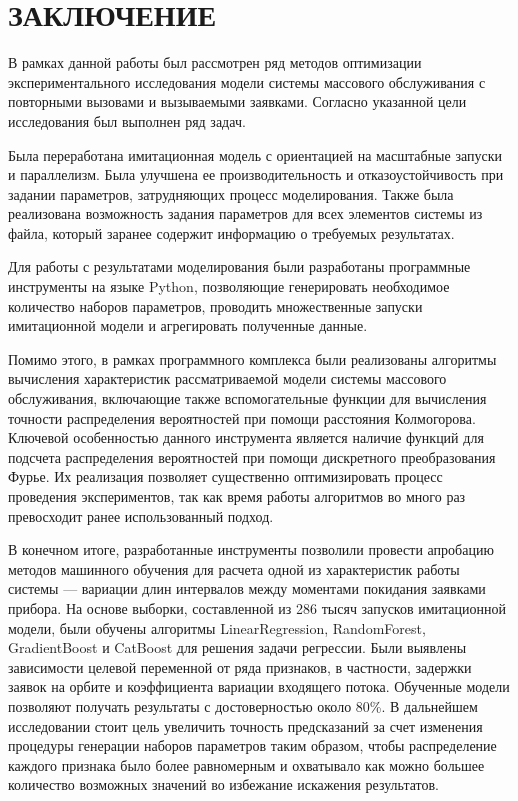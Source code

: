 \section*{\centering\normalsize ЗАКЛЮЧЕНИЕ}
В рамках данной работы был рассмотрен ряд методов оптимизации экспериментального исследования модели системы массового обслуживания с повторными вызовами и вызываемыми заявками. Согласно указанной цели исследования был выполнен ряд задач.

Была переработана имитационная модель с ориентацией на масштабные запуски и параллелизм. Была улучшена ее производительность и отказоустойчивость при задании параметров, затрудняющих процесс моделирования. Также была реализована возможность задания параметров для всех элементов системы из файла, который заранее содержит информацию о требуемых результатах.

Для работы с результатами моделирования были разработаны программные инструменты на языке Python, позволяющие генерировать необходимое количество наборов параметров, проводить множественные запуски имитационной модели и агрегировать полученные данные.

Помимо этого, в рамках программного комплекса были реализованы алгоритмы вычисления характеристик рассматриваемой модели системы массового обслуживания, включающие также вспомогательные функции для вычисления точности распределения вероятностей при помощи расстояния Колмогорова. Ключевой особенностью данного инструмента является наличие функций для подсчета распределения вероятностей при помощи дискретного преобразования Фурье. Их реализация позволяет существенно оптимизировать процесс проведения экспериментов, так как время работы алгоритмов во много раз превосходит ранее использованный подход.

В конечном итоге, разработанные инструменты позволили провести апробацию методов машинного обучения для расчета одной из характеристик работы системы --- вариации длин интервалов между моментами покидания заявками прибора. На основе выборки, составленной из 286 тысяч запусков имитационной модели, были обучены алгоритмы LinearRegression, RandomForest, GradientBoost и CatBoost для решения задачи регрессии. Были выявлены зависимости целевой переменной от ряда признаков, в частности, задержки заявок на орбите и коэффициента вариации входящего потока. Обученные модели позволяют получать результаты с достоверностью около 80\%. В дальнейшем исследовании стоит цель увеличить точность предсказаний за счет изменения процедуры генерации наборов параметров таким образом, чтобы распределение каждого признака было более равномерным и охватывало как можно большее количество возможных значений во избежание искажения результатов.

